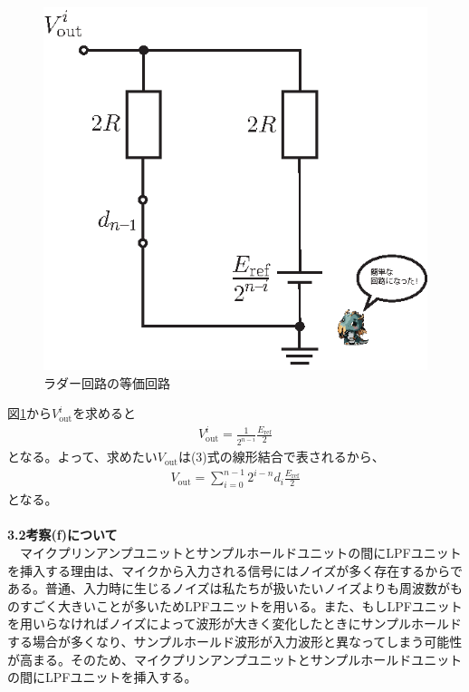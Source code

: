 \documentclass[a4paper,10.5pt]{ltjsarticle}
\begin{document}
\begin{figure}[h]
  \centering
  \includegraphics{figure5.eps}
  \vspace{-40pt}\caption{ラダー回路の等価回路}
  \label{radder5}
\end{figure}
図\ref{radder5}から$V^i_\mathrm{out}$を求めると
\begin{align}
  V^i_\mathrm{out}=\frac{1}{2^{n-i}}\frac{E_\mathrm{ref}}{2}
\end{align}
となる。よって、求めたい$V_\mathrm{out}$は(3)式の線形結合で表されるから、
\begin{align}
  V_\mathrm{out}=\sum^{n-1}_{i=0}2^{i-n}d_i\frac{E_\mathrm{ref}}{2}
\end{align}
となる。\\
\\
{\large \bfseries 3.2考察(f)について}\\
　マイクプリンアンプユニットとサンプルホールドユニットの間にLPFユニットを挿入する理由は、マイクから入力される信号にはノイズが多く存在するからである。普通、入力時に生じるノイズは私たちが扱いたいノイズよりも周波数がものすごく大きいことが多いためLPFユニットを用いる。また、もしLPFユニットを用いらなければノイズによって波形が大きく変化したときにサンプルホールドする場合が多くなり、サンプルホールド波形が入力波形と異なってしまう可能性が高まる。そのため、マイクプリンアンプユニットとサンプルホールドユニットの間にLPFユニットを挿入する。\\
\end{document}
